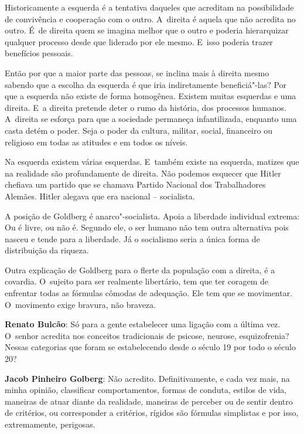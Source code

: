 Historicamente a esquerda é a tentativa daqueles que acreditam na
possibilidade de convivência e cooperação com o outro. A~direita é
aquela que não acredita no outro. É~de direita quem se imagina melhor
que o outro e poderia hierarquizar qualquer processo desde que liderado
por ele mesmo. E~isso poderia trazer benefícios pessoais.

Então por que a maior parte das pessoas, se inclina mais à direita mesmo
sabendo que a escolha da esquerda é que iria indiretamente
beneficiá"-las? Por que a esquerda não existe de forma homogênea. Existem
muitas esquerdas e uma direita. E~a direita pretende deter o rumo da
história, dos processos humanos. A~direita se esforça para que a
sociedade permaneça infantilizada, enquanto uma casta detém o poder.
Seja o poder da cultura, militar, social, financeiro ou religioso em
todas as atitudes e em todos os níveis.

 

Na esquerda existem várias esquerdas. E~também existe na esquerda,
matizes que na realidade são profundamente de direita. Não podemos
esquecer que Hitler chefiava um partido que se chamava Partido Nacional
dos Trabalhadores Alemães. Hitler alegava que era nacional --
socialista.

A posição de Goldberg é anarco"-socialista. Apoia a liberdade individual
extrema: Ou é livre, ou não é. Segundo ele, o ser humano não tem outra
alternativa pois nasceu e tende para a liberdade. Já o socialismo seria
a única forma de distribuição da riqueza.

Outra explicação de Goldberg para o flerte da população com a direita, é
a covardia. O~sujeito para ser realmente libertário, tem que ter
coragem de enfrentar todas as fórmulas cômodas de adequação. Ele tem que
se movimentar. O~movimento exige bravura, não braveza.

\begin{center}\asterisc{}\end{center}


\abrefala 

\textbf{Renato Bulcão}: Só para a gente estabelecer uma ligação com a
última vez. O~senhor acredita nos conceitos tradicionais de psicose,
neurose, esquizofrenia? Nessas categorias que foram se estabelecendo
desde o século 19 por todo o século 20?

 

\textbf{Jacob Pinheiro Golberg}: Não acredito. Definitivamente, e cada
vez mais, na minha opinião, classificar comportamentos, formas de
conduta, estilos de vida, maneiras de atuar diante da realidade,
maneiras de perceber ou de sentir dentro de critérios, ou corresponder a
critérios, rígidos são fórmulas simplistas e por isso, extremamente,
perigosas.

